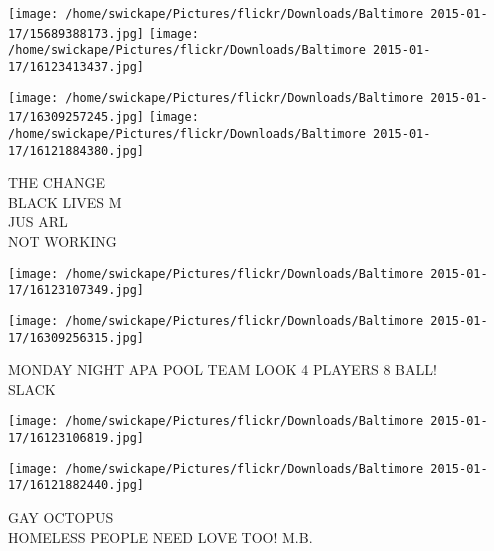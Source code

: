 \documentclass[10pt,letterpaper]{article}
\begin{document}
\texttt{[image: /home/swickape/Pictures/flickr/Downloads/Baltimore 2015-01-17/15689388173.jpg]}
\texttt{[image: /home/swickape/Pictures/flickr/Downloads/Baltimore 2015-01-17/16123413437.jpg]}

\texttt{[image: /home/swickape/Pictures/flickr/Downloads/Baltimore 2015-01-17/16309257245.jpg]}
\texttt{[image: /home/swickape/Pictures/flickr/Downloads/Baltimore 2015-01-17/16121884380.jpg]}

THE CHANGE\\
BLACK LIVES M\\
JUS ARL\\
NOT WORKING\\
\pagebreak

\texttt{[image: /home/swickape/Pictures/flickr/Downloads/Baltimore 2015-01-17/16123107349.jpg]}

\vspace{0.25in}
\texttt{[image: /home/swickape/Pictures/flickr/Downloads/Baltimore 2015-01-17/16309256315.jpg]}

MONDAY NIGHT APA POOL TEAM LOOK 4 PLAYERS 8 BALL!\\
SLACK\\
\pagebreak

\texttt{[image: /home/swickape/Pictures/flickr/Downloads/Baltimore 2015-01-17/16123106819.jpg]}

\vspace{0.25in}
\texttt{[image: /home/swickape/Pictures/flickr/Downloads/Baltimore 2015-01-17/16121882440.jpg]}

GAY OCTOPUS\\
HOMELESS PEOPLE NEED LOVE TOO!  M.B.\\
\pagebreak
\end{document}
